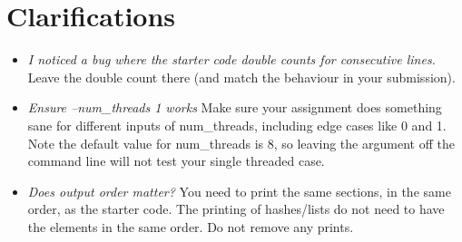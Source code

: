 \documentclass[12pt]{article}
\renewcommand{\_}{\kern-1.5pt\textunderscore\kern-1.5pt}
\begin{document}
\section*{Clarifications}

\begin{itemize}
  \item \emph{I noticed a bug where the starter code double counts for consecutive lines.} Leave the double count there (and match the behaviour in your submission).
  \item \emph{Ensure --num_threads 1 works} Make sure your assignment does something sane for different inputs of num_threads, including edge cases like 0 and 1. Note the default value for num_threads is 8, so leaving the argument off the command line will not test your single threaded case.
  \item \emph{Does output order matter?} You need to print the same sections, in the same order, as the starter code. The printing of hashes/lists do not need to have the elements in the same order. Do not remove any prints.
\end{itemize}  



\end{document}
